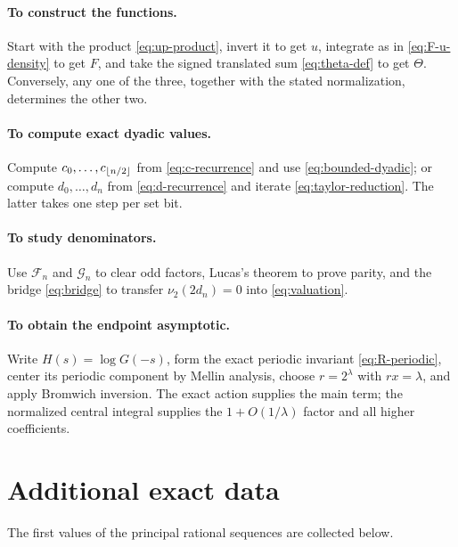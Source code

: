 \documentclass[11pt]{article}
\theoremstyle{definition}
\theoremstyle{remark}
\begin{document}
\paragraph{To construct the functions.}
Start with the product \eqref{eq:up-product}, invert it to get $u$, integrate as in \eqref{eq:F-u-density} to get $F$, and take the signed translated sum \eqref{eq:theta-def} to get $\Theta$.  Conversely, any one of the three, together with the stated normalization, determines the other two.

\paragraph{To compute exact dyadic values.}
Compute $c_0,\ldots,c_{\left\lfloor n/2\right\rfloor}$ from \eqref{eq:c-recurrence} and use \eqref{eq:bounded-dyadic}; or compute $d_0,\ldots,d_n$ from \eqref{eq:d-recurrence} and iterate \eqref{eq:taylor-reduction}.  The latter takes one step per set bit.

\paragraph{To study denominators.}
Use $\mathcal F_n$ and $\mathcal G_n$ to clear odd factors, Lucas's theorem to prove parity, and the bridge \eqref{eq:bridge} to transfer $\nu_2(2d_n)=0$ into \eqref{eq:valuation}.

\paragraph{To obtain the endpoint asymptotic.}
Write $H(s)=\log G(-s)$, form the exact periodic invariant \eqref{eq:R-periodic}, center its periodic component by Mellin analysis, choose $r=2^\lambda$ with $rx=\lambda$, and apply Bromwich inversion.  The exact action supplies the main term; the normalized central integral supplies the $1+O(1/\lambda)$ factor and all higher coefficients.

\appendix
\section{Additional exact data}\label{app:data}
The first values of the principal rational sequences are collected below.
\end{document}

